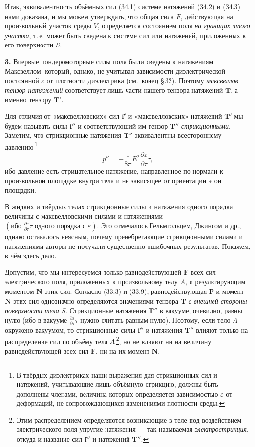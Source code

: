 \documentclass[a4paper,12pt]{article}
\begin{document}
Итак, эквивалентность объёмных сил (34.1) системе натяжений (34.2)
и (34.3) нами доказана, и мы можем утверждать, что общая сила $F$,
действующая на произвольный участок среды $V$, определяется состоянием
поля \textit{на границах этого участка}, т.\,е. может быть сведена
к системе сил или натяжений, приложенных к его поверхности $S$.


\textbf{3.} Впервые пондеромоторные силы поля были сведены к натяжениям
Максвеллом, который, однако, не учитывал зависимости диэлектрической
постоянной $\varepsilon$ от плотности диэлектрика (см.\ конец §\,32).
Поэтому \textit{максвеллов тензор натяжений} соответствует лишь части
нашего тензора натяжений $\mathbf{T}$, а именно тензору $\mathbf{T}'$.

Для отличия от «максвелловских» сил $\mathbf{f}'$ и «максвелловских»
натяжений $\mathbf{T}'$ мы будем называть силы $\mathbf{f}''$ и
соответствующий им тензор $\mathbf{T}''$ \textit{стрикционными}.
Заметим, что стрикционные натяжения $\mathbf{T}''$ эквивалентны
всестороннему давлению\,\footnote{В твёрдых диэлектриках наши выражения
для стрикционных сил и натяжений, учитывающие лишь объёмную стрикцию,
должны быть дополнены членами, величина которых определяется
зависимостью $\varepsilon$ от деформаций, не сопровождающихся
изменениями плотности среды.}
\begin{equation}
    p'' = -\frac{1}{8\pi}E^2\frac{\partial\varepsilon}{\partial\tau}\tau,
    \tag{34.4}
\end{equation}
ибо давление есть отрицательное натяжение, направленное по нормали
к произвольной площадке внутри тела и не зависящее от ориентации этой
площадки.

В жидких и твёрдых телах стрикционные силы и натяжения одного порядка
величины с максвелловскими силами и натяжениями
$\left(\text{ибо }\frac{\partial\varepsilon}{\partial\tau}\tau\text{ одного порядка с }\varepsilon\right)$.
Это отмечалось Гельмгольцем, Джинсом и др., однако оставалось неясным,
почему пренебрегающие стрикционными силами и натяжениями авторы не
получали существенно ошибочных результатов. Покажем, в чём здесь дело.

Допустим, что мы интересуемся только равнодействующей $\mathbf{F}$
всех сил электрического поля, приложенных к произвольному телу $A$,
и результирующим моментом $\mathbf{N}$ этих сил. Согласно (33.3)
и (33.9), равнодействующая $\mathbf{F}$ и момент $\mathbf{N}$ этих сил
однозначно определяются значениями тензора $\mathbf{T}$
\textit{с внешней стороны поверхности тела} $S$. Стрикционные натяжения
$\mathbf{T}''$ в вакууме, очевидно, равны нулю (ибо в вакууме
$\frac{\partial\varepsilon}{\partial\tau}\tau$ нужно считать равным
нулю). Поэтому, если тело $A$ окружено вакуумом, то стрикционные силы
$\mathbf{f}''$ и натяжения $\mathbf{T}''$ влияют только на распределение
сил по объёму тела $A$\,\footnote{Этим распределением определяются
возникающие в теле под воздействием электрического поля упругие
натяжения — так называемая \textit{электрострикция}, откуда и название
сил $\mathbf{f}''$ и натяжений $\mathbf{T}''$.}, но не влияют ни на
величину равнодействующей всех сил $\mathbf{F}$, ни на их момент
$\mathbf{N}$.
\end{document}
